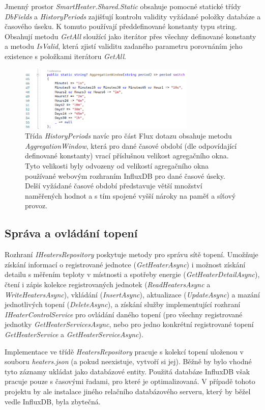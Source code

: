 \pagebreak
Jmenný prostor {\it SmartHeater.Shared.Static} obsahuje pomocné statické třídy {\it DbFields} a {\it HistoryPeriods} zajišťují kontrolu validity vyžádané položky databáze a časového úseku. K tomuto používají předdefinované konstanty typu string. Obsahují metodu {\it GetAll} sloužící jako iterátor přes všechny definované konstanty a metodu {\it IsValid}, která zjistí validitu zadaného parametru porovnáním jeho existence s položkami iterátoru {\it GetAll}.

\begin{figure}[hbt]
\includegraphics[width=0.75\textwidth]{obrazky-figures/code-aggregationwindow.png}
\caption{Třída {\it HistoryPeriods} navíc pro část Flux dotazu obsahuje metodu {\it AggregationWindow}, která pro dané časové období (dle odpovídající definované konstanty) vrací příslušnou velikost agregačního okna. Tyto velikosti byly odvozeny od velikostí agregačního okna používané webovým rozhraním InfluxDB pro dané časové úseky. Delší vyžádané časové období představuje větší množství naměřených hodnot a s tím spojené vyšší nároky na paměť a síťový provoz.}
\end{figure}


\subsection{Správa a ovládání topení}
Rozhraní {\it IHeatersRepository} poskytuje metody pro správu sítě topení. Umožňuje získání informací o registrované jednotce ({\it GetHeaterAsync}) i možnost získání detailu s měřením teploty v místnosti a spotřeby energie ({\it GetHeaterDetailAsync}), čtení i zápis kolekce registrovaných jednotek ({\it ReadHeatersAsync} a {\it WriteHeatersAsync}), vkládání ({\it InsertAsync}), aktualizace ({\it UpdateAsync}) a mazání jednotlivých topení ({\it DeleteAsync}), a získání služby implementující rozhraní {\it IHeaterControlService} pro ovládání daného topení (pro všechny registrované jednotky {\it GetHeaterServicesAsync}, nebo pro jedno konkrétní registrované topení {\it GetHeaterService} a {\it GetHeaterServiceAsync}).
 
Implementace ve třídě {\it HeatersRepository} pracuje s kolekcí topení uloženou v souboru {\it heaters.json} (a pokud neexistuje, vytvoří si jej). Běžně by bylo vhodné tyto záznamy ukládat jako databázové entity. Použitá databáze InfluxDB však pracuje pouze s časovými řadami, pro které je optimalizovaná. V případě tohoto projektu by ale instalace jiného relačního databázového serveru, který by běžel vedle InfluxDB, byla zbytečná.


